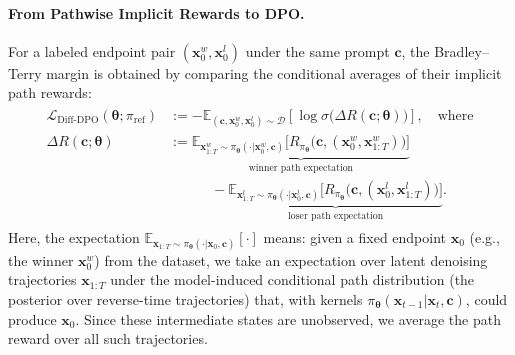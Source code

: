 \paragraph{From Pathwise Implicit Rewards to DPO.}
For a labeled endpoint pair $(\mathbf x_0^w,\mathbf x_0^l)$ under the same
prompt $\mathbf c$, the Bradley--Terry margin is obtained by comparing the
conditional averages of their implicit path rewards:
\begin{align}\label{eq:diffusion-dpo}
\begin{aligned}
\mathcal L_{\mathrm{Diff\text{-}DPO}}(\bm\theta;\pi_{\mathrm{ref}})
&:=
- \mathbb E_{(\mathbf c,\mathbf x_0^w,\mathbf x_0^l)\sim\mathcal D}
 \left[\log \sigma \big(\Delta R(\mathbf c;\bm\theta)\big)\right], \quad \text{where}\\
\Delta R(\mathbf c;\bm\theta)
&:=
\underbrace{\mathbb E_{\mathbf x_{1:T}^w\sim \pi_{\bm\theta}(\cdot | \mathbf x_0^w,\mathbf c)}
 \Big[R_{\pi_{\bm\theta}} \big(\mathbf c,(\mathbf x_0^w,\mathbf x_{1:T}^w)\big)\Big]}_{\text{winner path expectation}}
\\ &\quad\quad\quad-
\underbrace{\mathbb E_{\mathbf x_{1:T}^l\sim \pi_{\bm\theta}(\cdot | \mathbf x_0^l,\mathbf c)}
 \Big[R_{\pi_{\bm\theta}} \big(\mathbf c,(\mathbf x_0^l,\mathbf x_{1:T}^l)\big)\Big]}_{\text{loser path expectation}}. 
\end{aligned}
\end{align}
Here, the expectation $\mathbb E_{\mathbf x_{1:T}\sim\pi_{\bm\theta}(\cdot|\mathbf x_0,\mathbf c)}[\cdot]$ means:
given a fixed endpoint $\mathbf x_0$ (e.g., the winner $\mathbf x_0^w$) from the dataset, we take an
expectation over latent denoising trajectories $\mathbf x_{1:T}$ under the model-induced conditional path
distribution (the posterior over reverse-time trajectories) that, with kernels
$\pi_{\bm\theta}(\mathbf x_{t-1}|\mathbf x_t,\mathbf c)$, could produce $\mathbf x_0$.
Since these intermediate states are unobserved, we average the path reward over all such trajectories.


